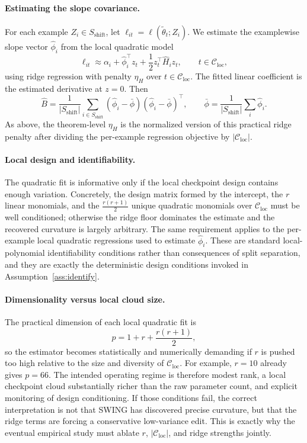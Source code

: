 \documentclass{article}
\newcommand{\cC}{\mathcal{C}}
\newcommand{\loss}{\ell}
\newcommand{\swing}{\textup{\textsc{SWING}}}
\begin{document}
\paragraph{Estimating the slope covariance.}
For each example \(Z_i \in S_{\mathrm{shift}}\), let \(\ell_{it}=\loss(\tilde\theta_t; Z_i)\). We estimate the examplewise slope vector \(\hat\phi_i\) from the local quadratic model
\[
\ell_{it}
\approx
\alpha_i + \hat\phi_i^\top z_t + \frac12 z_t^\top \hat H_i z_t,
\qquad
t\in\cC_{\mathrm{loc}},
\]
using ridge regression with penalty \(\eta_H\) over \(t\in\cC_{\mathrm{loc}}\). The fitted linear coefficient is the estimated derivative at \(z=0\). Then
\[
\hat B
=
\frac{1}{|S_{\mathrm{shift}}|}
\sum_{i\in S_{\mathrm{shift}}}
(\hat\phi_i-\bar\phi)(\hat\phi_i-\bar\phi)^\top,
\qquad
\bar\phi = \frac{1}{|S_{\mathrm{shift}}|}\sum_i \hat\phi_i.
\]
As above, the theorem-level \(\eta_H\) is the normalized version of this practical ridge penalty after dividing the per-example regression objective by \(|\cC_{\mathrm{loc}}|\).

\paragraph{Local design and identifiability.}
The quadratic fit is informative only if the local checkpoint design contains enough variation. Concretely, the design matrix formed by the intercept, the \(r\) linear monomials, and the \(\frac{r(r+1)}{2}\) unique quadratic monomials over \(\cC_{\mathrm{loc}}\) must be well conditioned; otherwise the ridge floor dominates the estimate and the recovered curvature is largely arbitrary. The same requirement applies to the per-example local quadratic regressions used to estimate \(\hat\phi_i\). These are standard local-polynomial identifiability conditions rather than consequences of split separation, and they are exactly the deterministic design conditions invoked in Assumption~\ref{ass:identify}.

\paragraph{Dimensionality versus local cloud size.}
The practical dimension of each local quadratic fit is
\[
p = 1 + r + \frac{r(r+1)}{2},
\]
so the estimator becomes statistically and numerically demanding if \(r\) is pushed too high relative to the size and diversity of \(\cC_{\mathrm{loc}}\). For example, \(r=10\) already gives \(p=66\). The intended operating regime is therefore modest rank, a local checkpoint cloud substantially richer than the raw parameter count, and explicit monitoring of design conditioning. If those conditions fail, the correct interpretation is not that \swing{} has discovered precise curvature, but that the ridge terms are forcing a conservative low-variance edit. This is exactly why the eventual empirical study must ablate \(r\), \(|\cC_{\mathrm{loc}}|\), and ridge strengths jointly.
\end{document}
